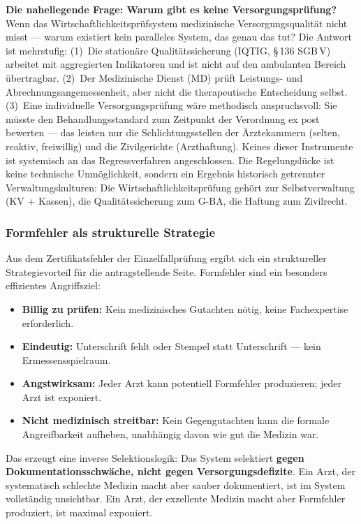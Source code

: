 \documentclass{umbruch-position}
\begin{document}
\textbf{Die naheliegende Frage: Warum gibt es keine Versorgungsprüfung?} Wenn das Wirtschaftlichkeitsprüfsystem medizinische Versorgungsqualität nicht misst --- warum existiert kein paralleles System, das genau das tut? Die Antwort ist mehrstufig: (1)~Die stationäre Qualitätssicherung (IQTIG, \S\,136 SGB\,V) arbeitet mit aggregierten Indikatoren und ist nicht auf den ambulanten Bereich übertragbar. (2)~Der Medizinische Dienst (MD) prüft Leistungs- und Abrechnungsangemessenheit, aber nicht die therapeutische Entscheidung selbst. (3)~Eine individuelle Versorgungsprüfung wäre methodisch anspruchsvoll: Sie müsste den Behandlungsstandard zum Zeitpunkt der Verordnung ex post bewerten --- das leisten nur die Schlichtungsstellen der Ärztekammern (selten, reaktiv, freiwillig) und die Zivilgerichte (Arzthaftung). Keines dieser Instrumente ist systemisch an das Regressverfahren angeschlossen. Die Regelungslücke ist keine technische Unmöglichkeit, sondern ein Ergebnis historisch getrennter Verwaltungskulturen: Die Wirtschaftlichkeitsprüfung gehört zur Selbstverwaltung (KV + Kassen), die Qualitätssicherung zum G-BA, die Haftung zum Zivilrecht.

\subsubsection{Formfehler als strukturelle Strategie}

Aus dem Zertifikatsfehler der Einzelfallprüfung ergibt sich ein struktureller Strategievorteil für die antragstellende Seite. Formfehler sind ein besonders effizientes Angriffsziel:

\begin{itemize}[nosep]
  \item \textbf{Billig zu prüfen:} Kein medizinisches Gutachten nötig, keine Fachexpertise erforderlich.
  \item \textbf{Eindeutig:} Unterschrift fehlt oder Stempel statt Unterschrift --- kein Ermessensspielraum.
  \item \textbf{Angstwirksam:} Jeder Arzt kann potentiell Formfehler produzieren; jeder Arzt ist exponiert.
  \item \textbf{Nicht medizinisch streitbar:} Kein Gegengutachten kann die formale Angreifbarkeit aufheben, unabhängig davon wie gut die Medizin war.
\end{itemize}

Das erzeugt eine inverse Selektionslogik: Das System selektiert \textbf{gegen Dokumentationsschwäche, nicht gegen Versorgungsdefizite}. Ein Arzt, der systematisch schlechte Medizin macht aber sauber dokumentiert, ist im System vollständig unsichtbar. Ein Arzt, der exzellente Medizin macht aber Formfehler produziert, ist maximal exponiert.
\end{document}
